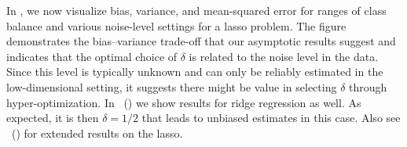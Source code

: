 

In , we now visualize bias, variance, and mean-squared
error for ranges of class balance and various noise-level settings for a lasso problem. The
figure demonstrates the bias--variance trade-off that our asymptotic results suggest and
indicates that the optimal choice of \(\delta\) is related to the noise level in the data.
Since this level is typically unknown and can only be reliably estimated in the
low-dimensional setting, it suggests there might be value in selecting \(\delta\) through
hyper-optimization. In
~() we show
results for ridge regression as well. As expected, it is then \(\delta = 1/2\) that leads
to unbiased estimates in this case. Also see
~() for extended
results on the lasso.


